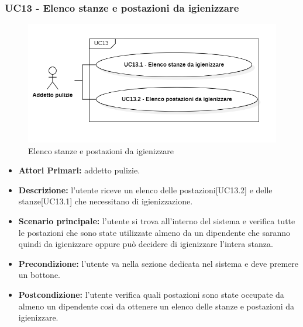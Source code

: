 \subsubsection{ UC13 - Elenco stanze e postazioni da igienizzare}
\begin{figure}[H]
		\centering
		\includegraphics[width=15cm]{res/images/UC13.png}
		\caption{Elenco stanze e postazioni da igienizzare}
		\label{fig:Elenco stanze e postazioni da igienizzare}
	\end{figure}
\begin{itemize}
           	\item\textbf{Attori Primari:} addetto pulizie.
           	\item\textbf{Descrizione:} l'utente riceve un elenco delle postazioni[UC13.2] e delle stanze[UC13.1] che necessitano di igienizzazione.
           	\item\textbf{Scenario principale:} l'utente si trova all'interno del sistema e verifica tutte le postazioni che sono state utilizzate almeno da un dipendente che saranno quindi da igienizzare oppure può decidere di igienizzare l’intera stanza.
           	\item\textbf{Precondizione:} l'utente va nella sezione dedicata nel sistema e deve premere un bottone.
           	\item\textbf{Postcondizione:} l'utente verifica quali postazioni sono state occupate da almeno un dipendente così da ottenere un elenco delle stanze e postazioni da igienizzare.
\end{itemize}


